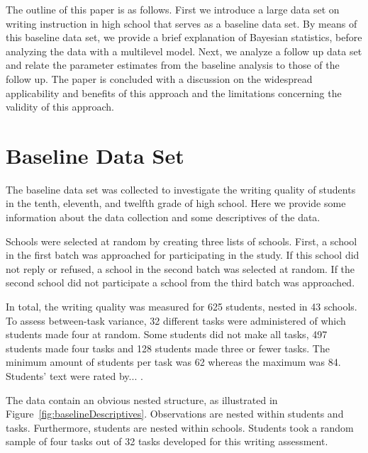 \documentclass[a4paper]{article}
\newcommand{\DON}	[1] 	{\todo[linecolor=gray, backgroundcolor=white]	{Don: 	{#1}}}
\begin{document}
The outline of this paper is as follows. First we introduce a large data set on writing instruction in high school that serves as a baseline data set. By means of this baseline data set, we provide a brief explanation of Bayesian statistics, before analyzing the data with a multilevel model. Next, we analyze a follow up data set and relate the parameter estimates from the baseline analysis to those of the follow up. The paper is concluded with a discussion on the widespread applicability and benefits of this approach and the limitations concerning the validity of this approach.



\section*{Baseline Data Set}
\noindent The baseline data set was collected to investigate the writing quality of students in the tenth, eleventh, and twelfth grade of high school. Here we provide some information about the data collection and some descriptives of the data.

Schools were selected at random by creating three lists of schools. First, a school in the first batch was approached for participating in the study. If this school did not reply or refused, a school in the second batch was selected at random. If the second school did not participate a school from the third batch was approached.

In total, the writing quality was measured for 625 students, nested in 43 schools. To assess between-task variance, 32 different tasks were administered of which students made four at random. Some students did not make all tasks, 497 students made four tasks and 128 students made three or fewer tasks. The minimum amount of students per task was 62 whereas the maximum was 84. Students' text were rated by... \DON{Aanvullen aub}.

The data contain an obvious nested structure, as illustrated in Figure~\ref{fig:baselineDescriptives}. Observations are nested within students and tasks. Furthermore, students are nested within schools. Students took a random sample of four tasks out of 32 tasks developed for this writing assessment.
\end{document}
